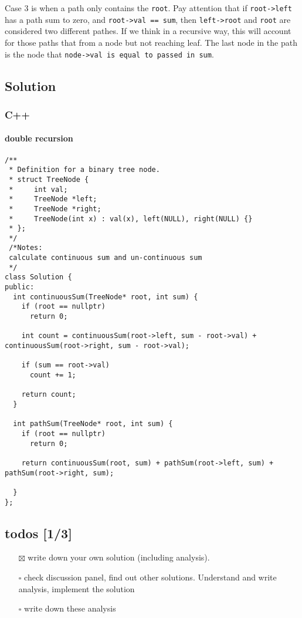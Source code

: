 \documentclass[11pt]{article}
\begin{document}
Case 3 is when a path only contains the \texttt{root}. Pay attention that if \texttt{root->left} has a path sum to zero, and \texttt{root->val == sum}, then \texttt{left->root} and \texttt{root} are considered two different pathes. If we think in a recursive way, this will account for those paths that from a node but not reaching leaf. The last node in the path is the node that \texttt{node->val is equal to passed in sum}.
\subsection{Solution}
\label{sec:org84c6228}
\subsubsection{C++}
\label{sec:org394f76f}
\paragraph{double recursion}
\label{sec:org6b308ce}
\begin{verbatim}
/**
 * Definition for a binary tree node.
 * struct TreeNode {
 *     int val;
 *     TreeNode *left;
 *     TreeNode *right;
 *     TreeNode(int x) : val(x), left(NULL), right(NULL) {}
 * };
 */
 /*Notes: 
 calculate continuous sum and un-continuous sum
 */
class Solution {
public:
  int continuousSum(TreeNode* root, int sum) {
    if (root == nullptr)
      return 0;

    int count = continuousSum(root->left, sum - root->val) + continuousSum(root->right, sum - root->val);

    if (sum == root->val)
      count += 1;

    return count;
  }

  int pathSum(TreeNode* root, int sum) {
    if (root == nullptr)
      return 0;

    return continuousSum(root, sum) + pathSum(root->left, sum) + pathSum(root->right, sum);

  }
};
\end{verbatim}
\subsection{todos [1/3]}
\label{sec:orgab9792c}
\begin{itemize}
\item[{$\boxtimes$}] write down your own solution (including analysis).
\item[{$\square$}] check discussion panel, find out other solutions. Understand and write analysis, implement the solution
\item[{$\square$}] write down these analysis
\end{itemize}
\end{document}
